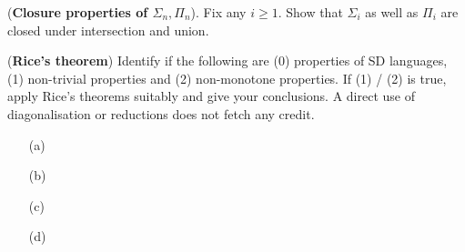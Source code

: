 \documentclass[12pt, a4paper,answers]{exam}
\begin{document}
\begin{questions}
\question[10] (\textbf{Closure properties of $\Sigma_n, \Pi_n$}). Fix any $i \ge 1$. Show that $\Sigma_i$ as well as $\Pi_i$ are closed under intersection and union.
		
	
	\begin{solution}
		
	\end{solution}
	
\question [20] (\textbf{Rice's theorem}) Identify if the following are (0) properties of SD languages, (1) non-trivial properties and (2) non-monotone properties. If (1) / (2) is true, apply Rice's theorems suitably and give your conclusions. A direct use of diagonalisation or reductions does not fetch any credit.



\begin{solution}
	\begin{enumerate}
		\item[(a)] 
		\item[(b)] 
		\item[(c)] 
		\item[(d)] 
	\end{enumerate}
\end{solution}


\end{questions}
\end{document}
